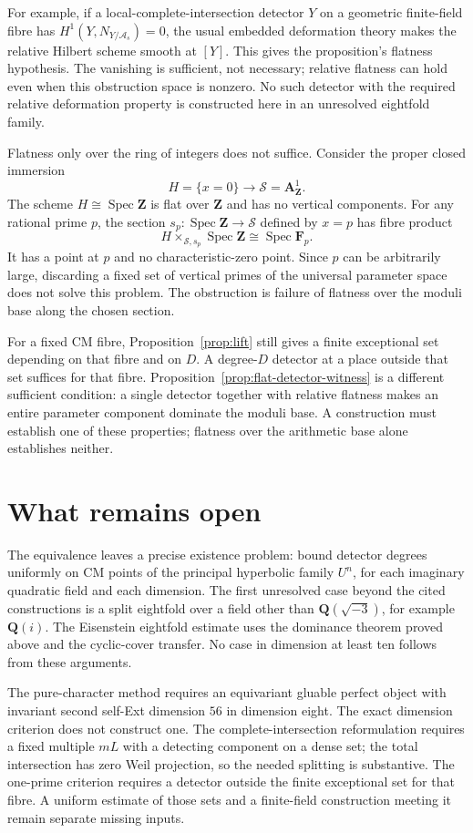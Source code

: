 \documentclass[11pt]{article}
\theoremstyle{definition}
\theoremstyle{remark}
\newcommand{\Q}{\mathbf Q}
\newcommand{\Z}{\mathbf Z}
\newcommand{\Spec}{\operatorname{Spec}}
\begin{document}
For example, if a local-complete-intersection detector $Y$ on a geometric finite-field fibre has $H^1(Y,N_{Y/\mathcal A_s})=0$, the usual embedded deformation theory makes the relative Hilbert scheme smooth at $[Y]$. This gives the proposition's flatness hypothesis. The vanishing is sufficient, not necessary; relative flatness can hold even when this obstruction space is nonzero. No such detector with the required relative deformation property is constructed here in an unresolved eightfold family.

Flatness only over the ring of integers does not suffice. Consider the proper closed immersion
\[
 H=\{x=0\}\longrightarrow\mathcal S=\mathbf A^1_\Z.
\]
The scheme $H\cong\Spec\Z$ is flat over $\Z$ and has no vertical components. For any rational prime $p$, the section $s_p:\Spec\Z\to\mathcal S$ defined by $x=p$ has fibre product
\[
 H\times_{\mathcal S,s_p}\Spec\Z\cong\Spec\mathbf F_p.
\]
It has a point at $p$ and no characteristic-zero point. Since $p$ can be arbitrarily large, discarding a fixed set of vertical primes of the universal parameter space does not solve this problem. The obstruction is failure of flatness over the moduli base along the chosen section.

For a fixed CM fibre, Proposition~\ref{prop:lift} still gives a finite exceptional set depending on that fibre and on $D$. A degree-$D$ detector at a place outside that set suffices for that fibre. Proposition~\ref{prop:flat-detector-witness} is a different sufficient condition: a single detector together with relative flatness makes an entire parameter component dominate the moduli base. A construction must establish one of these properties; flatness over the arithmetic base alone establishes neither.

\section{What remains open}\label{sec:open}
The equivalence leaves a precise existence problem: bound detector
degrees uniformly on CM points of the principal hyperbolic family
$U^n$, for each imaginary quadratic field and each dimension.
The first unresolved case beyond the cited constructions is a split
eightfold over a field other than $\Q(\sqrt{-3})$, for example $\Q(i)$.
The Eisenstein eightfold estimate uses the dominance theorem proved
above and the cyclic-cover transfer. No case in dimension at least ten follows
from these arguments.

The pure-character method requires an equivariant gluable perfect
object with invariant second self-Ext dimension $56$ in dimension
eight. The exact dimension criterion does not construct one. The
complete-intersection reformulation requires a fixed multiple $mL$
with a detecting component on a dense set; the total intersection
has zero Weil projection, so the needed splitting is substantive.
The one-prime criterion requires a detector outside the finite
exceptional set for that fibre. A uniform estimate of those sets and
a finite-field construction meeting it remain separate missing inputs.
\end{document}
